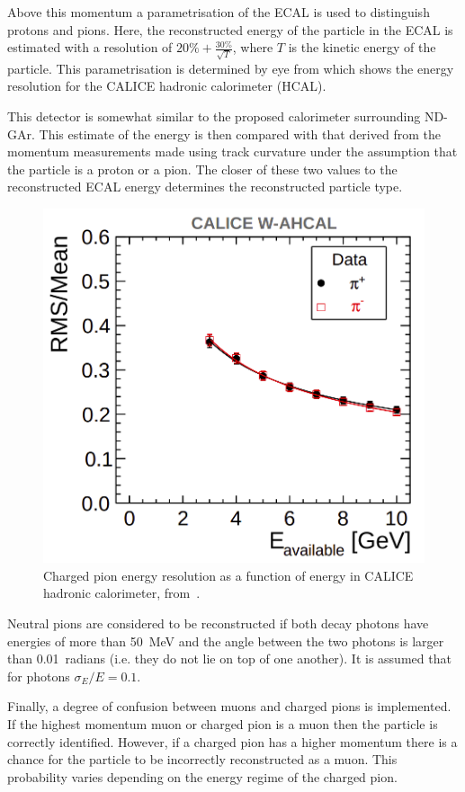Above this momentum a parametrisation of the ECAL is used to distinguish protons and pions.
Here, the reconstructed energy of the particle in the ECAL is estimated with a resolution of 
$20\% + \frac{30\%}{\sqrt{T}}$, where $T$ is the kinetic energy of the particle.
This parametrisation is determined by eye from  which shows the energy resolution for the CALICE hadronic calorimeter (HCAL).

This detector is somewhat similar to the proposed calorimeter surrounding ND-GAr.
This estimate of the energy is then compared with that derived from the momentum measurements made using track curvature under the assumption that the particle is a proton or a pion.
The closer of these two values to the reconstructed ECAL energy determines the reconstructed particle type.

\begin{figure}[h]
	\centering
	\includegraphics[width=.5\linewidth]{files/figures/dune_ndrwt/caliceParam}
	\caption[Charged pion energy resolution as a function of energy in the CALICE HCAL]{Charged pion energy resolution as a function of energy in CALICE hadronic calorimeter, from~\cite{hcalParam}.}
	\label{fig:caliceParam}
\end{figure}

Neutral pions are considered to be reconstructed if both decay photons have energies of more than \SI{50}{\MeV} and the angle between the two photons is larger than 0.01~radians (i.e. they do not lie on top of one another).
It is assumed that for photons $\sigma_{E}/E = 0.1$.

Finally, a degree of confusion between muons and charged pions is implemented.
If the highest momentum muon or charged pion is a muon then the particle is correctly identified.
However, if a charged pion has a higher momentum there is a chance for the particle to be incorrectly reconstructed as a muon.
This probability varies depending on the energy regime of the charged pion.


